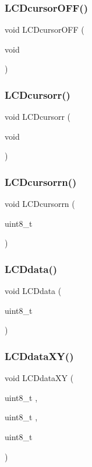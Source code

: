 \subsubsection{L\+C\+Dcursor\+O\+F\+F()}
{\footnotesize\ttfamily void L\+C\+Dcursor\+O\+FF (\begin{DoxyParamCaption}\item[{void}]{ }\end{DoxyParamCaption})}

\mbox{\label{lcd_8h_a4bea2eb4679aa54a409489209e86c5c1}} 
\subsubsection{L\+C\+Dcursorr()}
{\footnotesize\ttfamily void L\+C\+Dcursorr (\begin{DoxyParamCaption}\item[{void}]{ }\end{DoxyParamCaption})}

\mbox{\label{lcd_8h_ab56a63fef56c29a00c8a509600e73d22}} 
\subsubsection{L\+C\+Dcursorrn()}
{\footnotesize\ttfamily void L\+C\+Dcursorrn (\begin{DoxyParamCaption}\item[{uint8\+\_\+t}]{ }\end{DoxyParamCaption})}

\mbox{\label{lcd_8h_aef4aba080806aee7767a9a522c828d3f}} 
\subsubsection{L\+C\+Ddata()}
{\footnotesize\ttfamily void L\+C\+Ddata (\begin{DoxyParamCaption}\item[{uint8\+\_\+t}]{ }\end{DoxyParamCaption})}

\mbox{\label{lcd_8h_aedb2ca46842f10b0da1ffbfb881bdf50}} 
\subsubsection{L\+C\+Ddata\+X\+Y()}
{\footnotesize\ttfamily void L\+C\+Ddata\+XY (\begin{DoxyParamCaption}\item[{uint8\+\_\+t}]{,  }\item[{uint8\+\_\+t}]{,  }\item[{uint8\+\_\+t}]{ }\end{DoxyParamCaption})}


